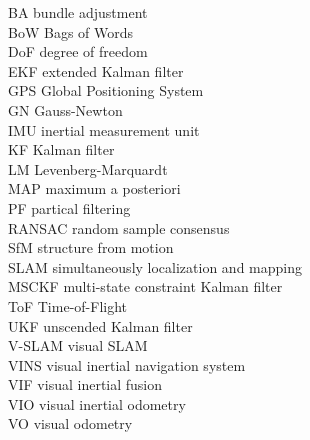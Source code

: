 \newpage
\noindent
BA        \hfill bundle adjustment                       \\
BoW       \hfill Bags of Words                           \\
DoF       \hfill degree of freedom                       \\
EKF       \hfill extended Kalman filter                  \\
GPS       \hfill Global Positioning System               \\
GN        \hfill Gauss-Newton                            \\
IMU       \hfill inertial measurement unit               \\
KF        \hfill Kalman filter                           \\
LM        \hfill Levenberg-Marquardt                     \\
MAP       \hfill maximum a posteriori                    \\
PF        \hfill partical filtering                      \\
RANSAC    \hfill random sample consensus                 \\
SfM       \hfill structure from motion                   \\
SLAM      \hfill simultaneously localization and mapping \\
MSCKF     \hfill multi-state constraint Kalman filter    \\
ToF       \hfill Time-of-Flight                          \\
UKF       \hfill unscended Kalman filter                 \\
V-SLAM    \hfill visual SLAM                             \\
VINS      \hfill visual inertial navigation system       \\
VIF       \hfill visual inertial fusion                  \\
VIO       \hfill visual inertial odometry                \\
VO        \hfill visual odometry                         \\


